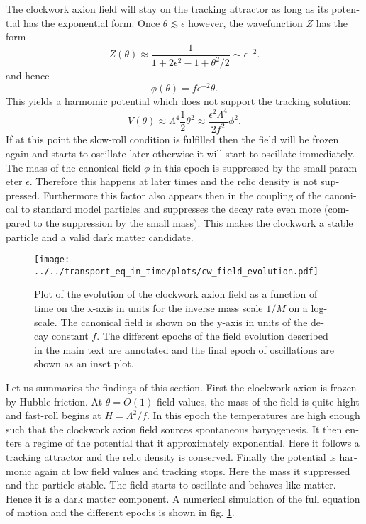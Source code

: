 \documentclass[master,       %
               twoside,        %
               BCOR10mm,       %
               english,ngerman, %
               ]{GAUBM}
\begin{document}
\begin{otherlanguage}{english}
The clockwork axion field will stay on the tracking attractor as long as its potential has the exponential form.
Once $\theta \lesssim \epsilon$ however, the wavefunction $Z$ has the form
\begin{equation}
	Z(\theta) \approx \frac{1}{1 + 2\epsilon^2 - 1 + \theta^2/2} \sim \epsilon^{-2}.
\end{equation}
and hence
\begin{equation}
	\label{eq:small_field_value_relation}
	\phi(\theta) = f \epsilon^{-2} \theta.
\end{equation}
This yields a harmomic potential which does not support the tracking solution:
\begin{equation}
	V(\theta) \approx \Lambda^4 \frac{1}{2} \theta^2 \approx \frac{\epsilon^2 \Lambda^4}{2 f^2} \phi^2.
\end{equation}
If at this point the slow-roll condition is fulfilled then the field will be frozen again and starts to oscillate later otherwise it will start to oscillate immediately.
The mass of the canonical field $\phi$ in this epoch is suppressed by the small parameter $\epsilon$. Therefore this happens at later times and the relic density is not suppressed.
Furthermore this factor also appears then in the coupling of the canonical to standard model particles and suppresses the decay rate even more (compared to the suppression by the small mass). This makes the clockwork a stable particle and a valid dark matter candidate.

\begin{figure}[H]
	\label{fig:evolution_of_clockwork_axion_field}
	\texttt{[image: ../../transport\_eq\_in\_time/plots/cw\_field\_evolution.pdf]}
	\caption{Plot of the evolution of the clockwork axion field as a function of time on the x-axis in units for the inverse mass scale $1/M$ on a log-scale. The canonical field is shown on the y-axis in units of the decay constant $f$. The different epochs of the field evolution described in the main text are annotated and the final epoch of oscillations are shown as an inset plot.}
\end{figure}
Let us summaries the findings of this section.
First the clockwork axion is frozen by Hubble friction. At $\theta = O(1)$ field values, the mass of the field is quite hight and fast-roll begins at $H = \Lambda^2 / f$. In this epoch the temperatures are high enough such that the clockwork axion field sources spontaneous baryogenesis.
It then enters a regime of the potential that it approximately exponential.
Here it follows a tracking attractor and the relic density is conserved.
Finally the potential is harmonic again at low field values and tracking stops.
Here the mass it suppressed and the particle stable.
The field starts to oscillate and behaves like matter. Hence it is a dark matter component. A numerical simulation of the full equation of motion and the different epochs is shown in fig. \ref{fig:evolution_of_clockwork_axion_field}.



\end{otherlanguage}
\end{document}
